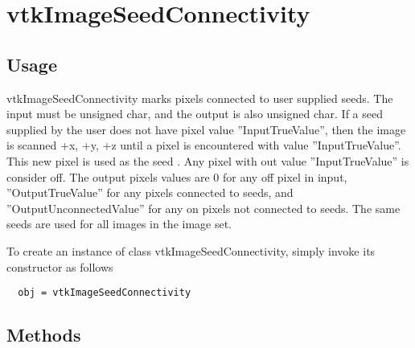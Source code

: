\section{vtkImageSeedConnectivity}

\subsection{Usage}

 vtkImageSeedConnectivity marks pixels connected to user supplied seeds.
 The input must be unsigned char, and the output is also unsigned char.  If
 a seed supplied by the user does not have pixel value ''InputTrueValue'',
 then the image is scanned +x, +y, +z until a pixel is encountered with
 value ''InputTrueValue''.  This new pixel is used as the seed .  Any pixel
 with out value ''InputTrueValue'' is consider off.  The output pixels values
 are 0 for any off pixel in input, ''OutputTrueValue'' for any pixels
 connected to seeds, and ''OutputUnconnectedValue'' for any on pixels not
 connected to seeds.  The same seeds are used for all images in the image
 set.

To create an instance of class vtkImageSeedConnectivity, simply
invoke its constructor as follows
\begin{verbatim}
  obj = vtkImageSeedConnectivity
\end{verbatim}
\subsection{Methods}

